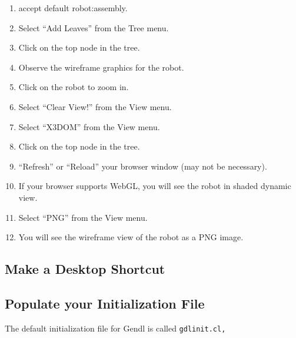 \documentclass [11pt]{book}
\begin{document}
\begin{enumerate}
\begin{enumerate}
\item accept default robot:assembly.

\item Select ``Add Leaves'' from the Tree menu.

\item Click on the top node in the tree.

\item Observe the wireframe graphics for the robot.

\item Click on the robot to zoom in.

\item Select ``Clear View!'' from the View menu.

\item Select ``X3DOM'' from the View menu.

\item Click on the top node in the tree.

\item ``Refresh'' or ``Reload'' your browser window (may not be necessary).
\item If your browser supports WebGL, you will see the robot in shaded dynamic view.

\item Select ``PNG'' from the View menu.

\item You will see the wireframe view of the robot as a PNG image.


\end{enumerate}



\end{enumerate}



\subsection{Make a Desktop Shortcut}

\label{subsec:makeadesktopshortcut}



\subsection{Populate your Initialization File}

\label{subsec:populateyourinitializationfile}

The default initialization file for Gendl is called 
\tt{gdlinit.cl}, 
\end{document}

